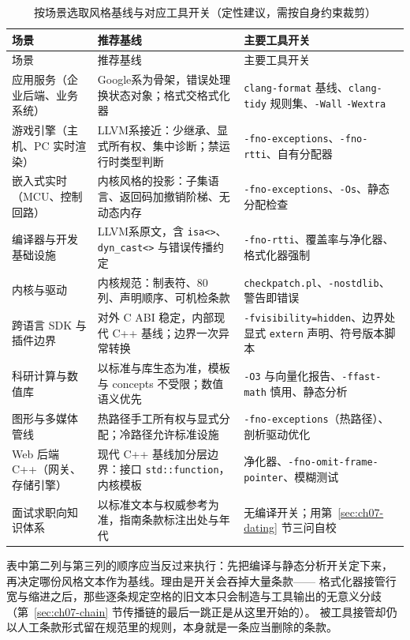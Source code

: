 \documentclass[12pt,a4paper,fontset=fandol]{ctexbook}
\newcommand{\Tp}[1]{\texttt{#1}}
\newcommand{\Bk}{\discretionary{}{}{}}
\newcommand{\Lang}[1]{\textsf{#1}}
\newcommand{\CPP}{\Lang{C++}}
\newcommand{\DomGo}{\Lang{Google}}
\newcommand{\DomLlvm}{\Lang{LLVM}}
\begin{document}
\begin{longtable}{>{\raggedright\arraybackslash}p{}
  >{\raggedright\arraybackslash}p{}
  >{\raggedright\arraybackslash}p{}}
\caption{按场景选取风格基线与对应工具开关（定性建议，需按自身约束裁剪）}\label{tab:apx-baseline}\\
\toprule
场景 & 推荐基线 & 主要工具开关 \\
\midrule
\endfirsthead
\toprule
场景 & 推荐基线 & 主要工具开关 \\
\midrule
\endhead
应用服务（企业后端、业务系统） & \DomGo 系为骨架，错误处理换状态对象；格式交格式化器 & \Tp{clang-format} 基线、\Tp{clang-tidy} 规则集、\Tp{-Wall} \Tp{-Wextra} \\
游戏引擎（主机、PC 实时渲染） & \DomLlvm 系接近：少继承、显式所有权、集中诊断；禁运行时类型判断 & \Tp{-fno-\Bk exceptions}、\Tp{-fno-rtti}、自有分配器 \\
嵌入式实时（MCU、控制回路） & 内核风格的投影：子集语言、返回码加撤销阶梯、无动态内存 & \Tp{-fno-exceptions}、\Tp{-Os}、静态分配检查 \\
编译器与开发基础设施 & \DomLlvm 系原文，含 \Tp{isa<>}、\Tp{dyn\_{\Bk}cast<>} 与错误传播约定 & \Tp{-fno-rtti}、覆盖率与净化器、格式化器强制 \\
内核与驱动 & 内核规范：制表符、80 列、声明顺序、可机检条款 & \Tp{checkpatch.pl}、\Tp{-nostdlib}、警告即错误 \\
跨语言 SDK 与插件边界 & 对外 C ABI 稳定，内部现代 \CPP{} 基线；边界一次异常转换 & \Tp{-fvisibility=hidden}、边界处显式 \Tp{extern} 声明、符号版本脚本 \\
科研计算与数值库 & 以标准与库生态为准，模板与 concepts 不受限；数值语义优先 & \Tp{-O3} 与向量化报告、\Tp{-ffast-math} 慎用、静态分析 \\
图形与多媒体管线 & 热路径手工所有权与显式分配；冷路径允许标准设施 & \Tp{-fno-\Bk exceptions}（热路径）、剖析驱动优化 \\
Web 后端 \CPP（网关、存储引擎） & 现代 \CPP{} 基线加分层边界：接口 \Tp{std::function}，内核模板 & 净化器、\Tp{-fno-omit-frame-\Bk pointer}、模糊测试 \\
面试求职向知识体系 & 以标准文本与权威参考为准，指南条款标注出处与年代 & 无编译开关；用第~\ref{sec:ch07-dating} 节三问自校 \\
\bottomrule
\end{longtable}

\begin{bestpractice}[title={先定开关，再写条款}]
  表中第二列与第三列的顺序应当反过来执行：先把编译与静态分析开关定下来，
  再决定哪份风格文本作为基线。理由是开关会吞掉大量条款——
  格式化器接管行宽与缩进之后，那些逐条规定空格的旧文本只会制造与工具输出的无意义分歧
  （第~\ref{sec:ch07-chain} 节传播链的最后一跳正是从这里开始的）。
  被工具接管却仍以人工条款形式留在规范里的规则，本身就是一条应当删除的条款。
\end{bestpractice}
\end{document}
